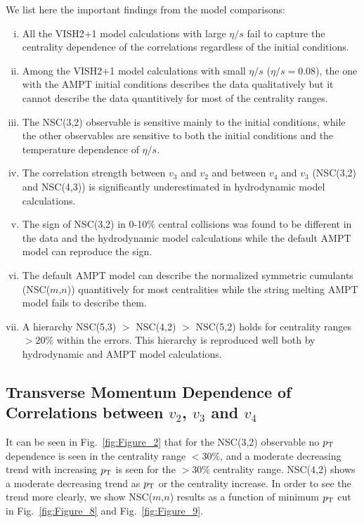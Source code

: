 We list here the important findings from the model comparisons:
\begin{enumerate}[(i)]
	\item All the VISH2+1 model calculations with large $\eta/s$ fail to capture the centrality dependence of the correlations regardless of the initial conditions.
	\item Among the VISH2+1 model calculations with small $\eta/s$ ($\eta/s=0.08$), the one with the AMPT initial conditions describes the data qualitatively but it cannot describe the data quantitively for most of the centrality ranges.
	\item The NSC(3,2) observable is sensitive mainly to the initial conditions, while the other observables are sensitive to both the initial conditions and the temperature dependence of $\eta/s$.
	\item The correlation strength between $v_3$ and $v_2$ and between $v_4$ and $v_3$ (NSC(3,2) and NSC(4,3)) is significantly underestimated in hydrodynamic model calculations.
	\item The sign of NSC(3,2) in 0-10\% central collisions was found to be different in the data and the hydrodynamic model calculations while the default AMPT model can reproduce the sign.
	\item The default AMPT model can describe the normalized symmetric cumulants (NSC($m$,$n$)) quantitively for most centralities while the string melting AMPT model fails to describe them.
	\item A hierarchy NSC(5,3) $>$ NSC(4,2) $>$ NSC(5,2) holds for centrality ranges $>20\%$ within the errors. This hierarchy is reproduced well both by hydrodynamic and AMPT model calculations.

\end{enumerate}


\subsection{Transverse Momentum Dependence of Correlations between $v_2$, $v_3$ and $v_4$}
\label{sec:ptdepsc}

It can be seen in Fig.~\ref{fig:Figure_2} that for the NSC(3,2) observable no $p_{\rm T}$ dependence is seen in the centrality range $<$30\%, and a moderate decreasing trend with increasing $p_{\rm T}$ is seen for the $>$30\% centrality range.
NSC(4,2) shows a moderate decreasing trend as $p_{\rm T}$ or the centrality increase. 
In order to see the trend more clearly, we show NSC($m$,$n$) results as a function of minimum $p_{\rm T}$ cut in Fig.~\ref{fig:Figure_8} and Fig.~\ref{fig:Figure_9}.

